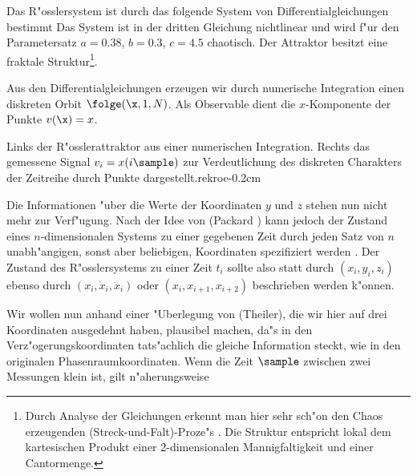 Das R"osslersystem \cite{Roessler76} ist durch das folgende System von
Differentialgleichungen bestimmt
Das System ist in der dritten Gleichung nichtlinear und wird f"ur den Parametersatz
$a=0.38$, $b=0.3$, $c=4.5$ chaotisch. Der Attraktor besitzt eine fraktale
Struktur\footnote{Durch Analyse der Gleichungen erkennt man hier sehr sch"on den Chaos
  erzeugenden \metapher(Streck-und-Falt)-Proze"s \cite{Peitgen92} .  Die Struktur
  entspricht lokal dem kartesischen Produkt einer 2-dimensionalen Mannigfaltigkeit und einer
  Cantormenge.}.

Aus den Differentialgleichungen erzeugen wir durch numerische Integration einen diskreten
Orbit $\folge(\x,1,N)$\footnotemark.  Als Observable dient die $x$-Komponente der Punkte $v(\x)=x$.


{Links der R"osslerattraktor aus einer numerischen
Integration. Rechts das gemessene Signal $v_i=x(i\sample)$ zur Verdeutlichung des
diskreten Charakters der Zeitreihe durch Punkte dargestellt.}{rekroe}{-0.2cm}

Die Informationen "uber die Werte der Koordinaten $y$ und $z$ stehen nun nicht mehr zur
Verf"u\-gung. Nach der Idee von \autor(Packard \etal) kann jedoch der Zustand eines
$n$-dimensio\-na\-len Systems zu einer gegebenen Zeit durch jeden Satz von $n$
unabh"angigen, sonst aber beliebigen, Koordinaten spezifiziert werden \cite{Packard80}.
Der Zustand des R"osslersystems zu einer Zeit $t_i$ sollte also statt durch
$(x_i,y_i,z_i)$ ebenso durch $(x_i,\dot x_i,\ddot x_i)$ oder $(x_i,x_{i+1},x_{i+2})$
beschrieben werden k"onnen.

Wir wollen nun anhand einer "Uberlegung von \autor(Theiler), die wir hier auf drei
Koordinaten ausgedehnt haben, plausibel machen, da"s in den Verz"ogerungskoordinaten
tats"achlich die gleiche Information steckt, wie in den originalen Phasenraumkoordinaten.
Wenn die Zeit $\sample$ zwischen zwei Messungen klein ist, gilt n"aherungsweise

